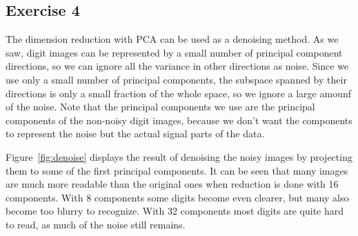 \documentclass{article}
\begin{document}
\subsection{Exercise 4}

The dimension reduction with PCA can be used as a denoising method.
As we saw, digit images can be represented by a small number of principal component directions, so we can ignore all the variance in other directions as noise.
Since we use only a small number of principal components, the subspace spanned by their directions is only a small fraction of the whole space, so we ignore a large amounf of the noise.
Note that the principal components we use are the principal components of the non-noisy digit images, because we don't want the components to represent the noise but the actual signal parts of the data.

Figure~\ref{fig:denoise} displays the result of denoising the noisy images by projecting them to some of the first principal components. It can be seen that many images are much more readable than the original ones when reduction is done with 16 components. With 8 components some digits become even clearer, but many also become too blurry to recognize. With 32 components most digits are quite hard to read, as much of the noise still remains.
\end{document}
